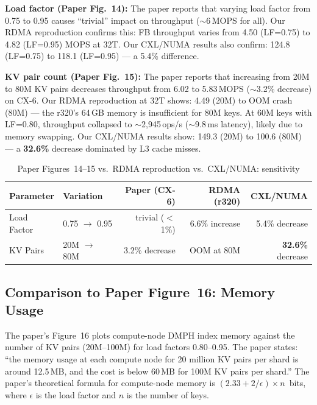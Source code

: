 \documentclass[11pt,a4paper]{article}
\begin{document}
\textbf{Load factor (Paper Fig.~14):} The paper reports that varying load factor from 0.75 to 0.95 causes ``trivial'' impact on throughput ($\sim$6\,MOPS for all). Our RDMA reproduction confirms this: FB throughput varies from 4.50 (LF=0.75) to 4.82 (LF=0.95) MOPS at 32T. Our CXL/NUMA results also confirm: 124.8 (LF=0.75) to 118.1 (LF=0.95) --- a 5.4\% difference.

\textbf{KV pair count (Paper Fig.~15):} The paper reports that increasing from 20M to 80M KV pairs decreases throughput from 6.02 to 5.83\,MOPS ($\sim$3.2\% decrease) on CX-6. Our RDMA reproduction at 32T shows: 4.49 (20M) to OOM crash (80M) --- the r320's 64\,GB memory is insufficient for 80M keys. At 60M keys with LF=0.80, throughput collapsed to $\sim$2,945\,ops/s ($\sim$9.8\,ms latency), likely due to memory swapping. Our CXL/NUMA results show: 149.3 (20M) to 100.6 (80M) --- a \textbf{32.6\%} decrease dominated by L3 cache misses.

\begin{table}[H]
\centering
\caption{Paper Figures~14--15 vs.\ RDMA reproduction vs.\ CXL/NUMA: sensitivity}
\label{tab:paper-fig14-15}
\small
\begin{tabular}{@{}llrrr@{}}
\toprule
\textbf{Parameter} & \textbf{Variation} & \textbf{Paper (CX-6)} & \textbf{RDMA (r320)} & \textbf{CXL/NUMA} \\
\midrule
Load Factor & 0.75 $\to$ 0.95 & trivial ($<$1\%) & 6.6\% increase & 5.4\% decrease \\
KV Pairs & 20M $\to$ 80M    & 3.2\% decrease & OOM at 80M & \textbf{32.6\%} decrease \\
\bottomrule
\end{tabular}
\end{table}

\subsection{Comparison to Paper Figure~16: Memory Usage}

The paper's Figure~16 plots compute-node DMPH index memory against the number of KV pairs (20M--100M) for load factors 0.80--0.95. The paper states: ``the memory usage at each compute node for 20 million KV pairs per shard is around 12.5\,MB, and the cost is below 60\,MB for 100M KV pairs per shard.'' The paper's theoretical formula for compute-node memory is $(2.33 + 2/\epsilon) \times n$~bits, where $\epsilon$ is the load factor and $n$ is the number of keys.
\end{document}
